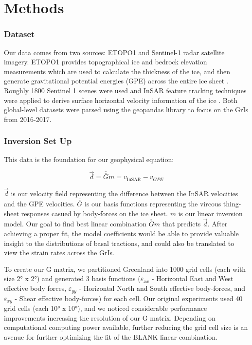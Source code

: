 \documentclass{article}
\begin{document}
\section{Methods}

\subsubsection{Dataset}
Our data comes from two sources: ETOPO1 and Sentinel-1 radar satellite imagery. ETOPO1 provides topographical ice and bedrock elevation measurements which are used to calculate the thickness of the ice, and then generate gravitational potential energies (GPE) across the entire ice sheet \cite{information_ncei_etopo1_nodate}. Roughly 1800 Sentinel 1 scenes were used and InSAR feature tracking techniques were applied to derive surface horizontal velocity information of the ice \cite{nagler_sentinel-1_2015}. Both global-level datasets were parsed using the geopandas library to focus on the GrIs from 2016-2017. 

\subsubsection{Inversion Set Up}
This data is the foundation for our geophysical equation:

$$
\vec{d}=\overline{\overline{G}} m=v_{\text {InSAR}}-v_{GPE}
$$


$\vec{d}$ is our velocity field representing the difference between the InSAR velocities and the GPE velocities. $\overline{\overline{G}}$ is our basis functions representing the vircous thing-sheet responses casued by body-forces on the ice sheet. $m$ is our linear inversion model. Our goal to find best linear combination $\overline{\overline{G}} m$ that predicts $\vec{d}$. After achieving a proper fit, the model coefficients would be able to provide valuable insight to the distributions of basal tractions, and could also be translated to view the strain rates across the GrIs.

To create our G matrix, we partitioned Greenland into 1000 grid cells (each with size 2° x 2°) and generated 3 basis functions ($\varepsilon_{xx}$ - Horizontal East and West effective body forces, $\varepsilon_{yy}$ - Horizontal North and South effective body-forces, and $\varepsilon_{xy}$ - Shear effective body-forces) for each cell. Our original experiments used 40 grid cells (each 10° x 10°), and we noticed considerable performance improvements increasing the resolution of our G matrix. Depending on computational computing power available, further reducing the grid cell size is an avenue for further optimizing the fit of the BLANK linear combination.   
\end{document}
